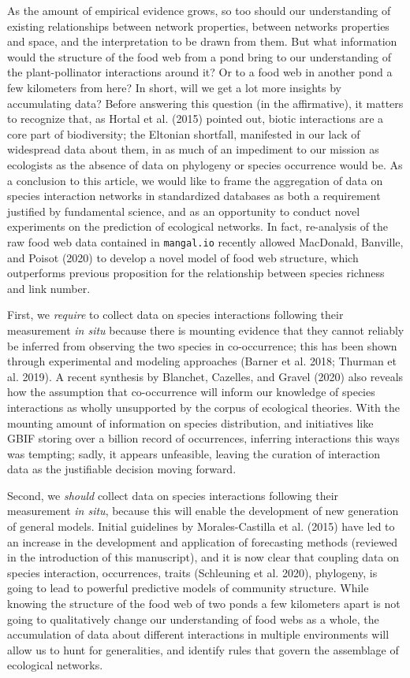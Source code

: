 \documentclass[11pt]{article}
\begin{document}
As the amount of empirical evidence grows, so too should our
understanding of existing relationships between network properties,
between networks properties and space, and the interpretation to be
drawn from them. But what information would the structure of the food
web from a pond bring to our understanding of the plant-pollinator
interactions around it? Or to a food web in another pond a few
kilometers from here? In short, will we get a lot more insights by
accumulating data? Before answering this question (in the affirmative),
it matters to recognize that, as Hortal et al. (2015) pointed out,
biotic interactions are a core part of biodiversity; the Eltonian
shortfall, manifested in our lack of widespread data about them, in as
much of an impediment to our mission as ecologists as the absence of
data on phylogeny or species occurrence would be. As a conclusion to
this article, we would like to frame the aggregation of data on species
interaction networks in standardized databases as both a requirement
justified by fundamental science, and as an opportunity to conduct novel
experiments on the prediction of ecological networks. In fact,
re-analysis of the raw food web data contained in \texttt{mangal.io}
recently allowed MacDonald, Banville, and Poisot (2020) to develop a
novel model of food web structure, which outperforms previous
proposition for the relationship between species richness and link
number.

First, we \emph{require} to collect data on species interactions
following their measurement \emph{in situ} because there is mounting
evidence that they cannot reliably be inferred from observing the two
species in co-occurrence; this has been shown through experimental and
modeling approaches (Barner et al. 2018; Thurman et al. 2019). A recent
synthesis by Blanchet, Cazelles, and Gravel (2020) also reveals how the
assumption that co-occurrence will inform our knowledge of species
interactions as wholly unsupported by the corpus of ecological theories.
With the mounting amount of information on species distribution, and
initiatives like GBIF storing over a billion record of occurrences,
inferring interactions this ways was tempting; sadly, it appears
unfeasible, leaving the curation of interaction data as the justifiable
decision moving forward.

Second, we \emph{should} collect data on species interactions following
their measurement \emph{in situ}, because this will enable the
development of new generation of general models. Initial guidelines by
Morales-Castilla et al. (2015) have led to an increase in the
development and application of forecasting methods (reviewed in the
introduction of this manuscript), and it is now clear that coupling data
on species interaction, occurrences, traits (Schleuning et al. 2020),
phylogeny, is going to lead to powerful predictive models of community
structure. While knowing the structure of the food web of two ponds a
few kilometers apart is not going to qualitatively change our
understanding of food webs as a whole, the accumulation of data about
different interactions in multiple environments will allow us to hunt
for generalities, and identify rules that govern the assemblage of
ecological networks.
\end{document}
